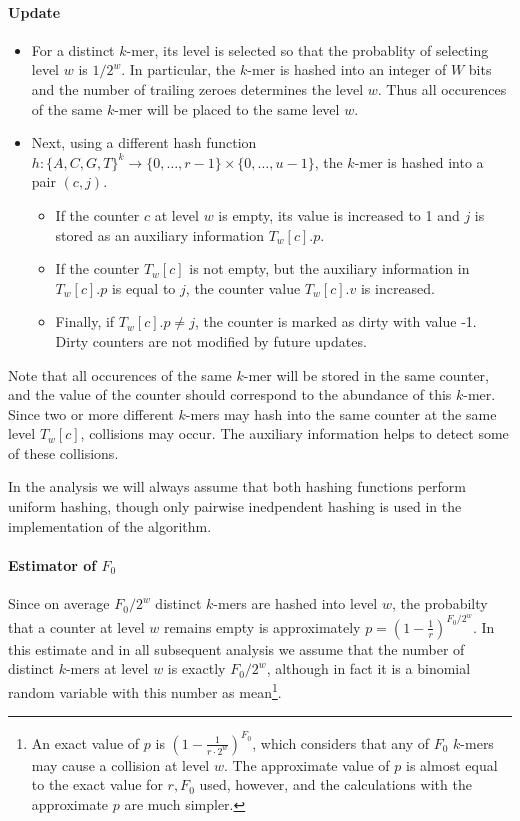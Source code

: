 \paragraph{Update}
\begin{itemize}
\item For a distinct $k$-mer, its level is selected so that the probablity of selecting 
level $w$ is $1/2^w$. In particular, the $k$-mer is hashed into an integer of $W$ bits 
and the number of trailing zeroes determines the level $w$. Thus all occurences of the same
$k$-mer will be placed to the same level $w$.

\item Next, using a different hash function
$h: \{A, C, G, T\}^k \rightarrow \{ 0, \dots, r-1\} \times \{ 0, \dots, u-1\}$, 
the $k$-mer is hashed into a pair $(c, j)$. 
\begin{itemize}
\item If the counter $c$ at level $w$ is empty, its value is increased to 1 and $j$
is stored as an auxiliary information  $T_w[c].p$.
\item If the counter $T_w[c]$ is not empty, but the auxiliary information in $T_w[c].p$ 
is equal to $j$, the counter value $T_w[c].v$ is increased.
\item Finally, if $T_w[c].p \neq j$, the counter is marked as dirty with value -1.
Dirty counters are not modified by future updates.
\end{itemize}
\end{itemize}
Note that all occurences of the same $k$-mer will be stored in the same counter, 
and the value of the counter should correspond to the abundance of this $k$-mer.
Since two or more different $k$-mers may hash into the same counter at the same
level $T_w[c]$, collisions may occur. The auxiliary information helps to detect
some of these collisions.

In the analysis we will always assume that both hashing functions perform uniform hashing,
though only pairwise inedpendent hashing is used in the implementation of the algorithm.

\paragraph{Estimator of $F_0$}
Since on average $F_0 / 2^w$ distinct $k$-mers are hashed into level $w$, the probabilty
that a counter at level $w$ remains empty is approximately $p = (1 - \frac{1}{r})^{F_0/2^w}$.
In this estimate and in all subsequent analysis we assume that the number of distinct $k$-mers
at level $w$ is exactly $F_0/2^w$, although in fact it is a binomial random variable with
this number as mean\footnote{An exact value of $p$ is $(1 - \frac{1}{r \cdot 2^w})^{F_0}$,
which considers that any of $F_0$ $k$-mers may cause a collision at level $w$.
The approximate value of $p$ is almost equal to the exact value for $r, F_0$ used, however,
and the calculations with the approximate $p$ are much simpler.}.

